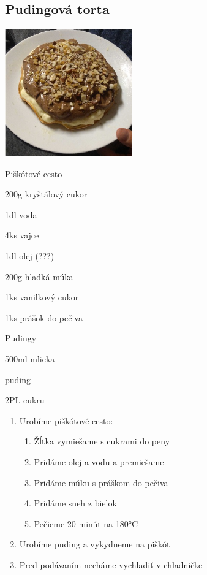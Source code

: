 \setcounter{step}{0}
\subsection{Pudingová torta}

\begin{ingredient}
\includegraphics[height=5.5cm]{images/eh_torta}
\def\portions{4}%

\vspace{0.3cm}

\begin{subingredient}{Piškótové cesto}
	\item 200g kryštálový cukor
	\item 1dl voda
	\item 4ks vajce
	\item 1dl olej (???)
	\item 200g hladká múka
	\item 1ks vanilkový cukor
	\item 1ks prášok do pečiva
\end{subingredient}
\begin{subingredient}{Pudingy}
	\item 500ml mlieka
	\item puding
	\item 2PL cukru
\end{subingredient}
\end{ingredient}
\begin{recipe}

\begin{enumerate}


\item{Urobíme piškótové cesto:}
\begin{enumerate}
\item{Žĺtka vymiešame s cukrami do peny}
\item{Pridáme olej a vodu a premiešame}
\item{Pridáme múku s práškom do pečiva}
\item{Pridáme sneh z bielok}
\item{Pečieme 20 minút na 180°C}
\end{enumerate}

\item{Urobíme puding a vykydneme na piškót}	
\item{Pred podávaním necháme vychladiť v chladničke}

\end{enumerate}
\end{recipe}

\begin{notes}

\end{notes}
\clearpage	